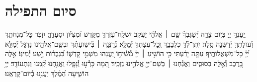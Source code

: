 \documentclass[twoside, openany, parskip=half, 11pt]{book}
\begin{document}
\negline
\kafdalet


\etzchaim




\nextpage

\section[סיום התפילה]{ סיום התפילה }
\label{ashrei}
\ashrei



יַֽעַנְךָ֣ יְיָ֭ בְּי֣וֹם צָרָ֑ה יְ֝שַׂגֶּבְךָ֗ שֵׁ֤ם ׀ אֱלֹהֵ֬י יַעֲקֹֽב׃
יִשְׁלַֽח־עֶזְרְךָ֥ מִקֹּ֑דֶשׁ וּ֝מִצִּיּ֗וֹן יִסְעָדֶֽךָּ׃
יִזְכֹּ֥ר כׇּל־מִנְחֹתֶ֑ךָ וְ֯עוֹלָתְךָ֖ יְ֯דַשְּׁנֶ֣ה סֶֽלָה׃
יִֽתֶּן־לְ֯ךָ֥ כִלְבָבֶ֑ךָ וְֽכׇל־עֲצָתְךָ֥ יְ֯מַלֵּֽא׃
נְ֯רַנְּנָ֤ה ׀ בִּ֘ישׁ֤וּעָתֶ֗ךָ וּבְשֵֽׁם־אֱלֹהֵ֥ינוּ נִדְגֹּ֑ל יְ֯מַלֵּ֥א יְ֝יָ֗ כׇּל־מִשְׁאֲלוֹתֶֽיךָ׃
עַתָּ֤ה יָדַ֗עְתִּי כִּ֤י הוֹשִׁ֥יעַ ׀ יְיָ֗ מְ֯שִׁ֫יח֥וֹ יַ֭עֲנֵהוּ מִשְּׁמֵ֣י קׇדְשׁ֑וֹ בִּ֝גְבֻר֗וֹת יֵ֣שַׁע יְ֯מִינֽוֹ׃
אֵ֣לֶּה בָ֭רֶכֶב וְ֯אֵ֣לֶּה בַסּוּסִ֑ים וַאֲנַ֓חְנוּ ׀ בְּשֵׁם־יְיָ֖ אֱלֹהֵ֣ינוּ נַזְכִּֽיר׃
הֵ֭מָּה כָּרְ֯ע֣וּ וְ֯נָפָ֑לוּ וַאֲנַ֥חְנוּ קַּ֝֗מְנוּ וַנִּתְעוֹדָֽד׃
יְיָ֥ הוֹשִׁ֑יעָה הַ֝מֶּ֗לֶךְ יַעֲנֵ֥נוּ בְ֯יוֹם־קׇרְאֵֽנוּ׃
\end{document}
